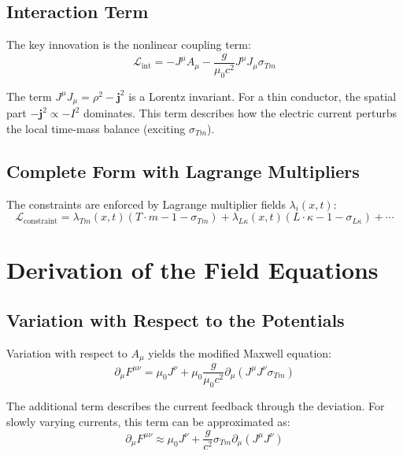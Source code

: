 	\subsection{Interaction Term}
	The key innovation is the nonlinear coupling term:
	\begin{equation}
		\mathcal{L}_{\text{int}} = -J^\mu A_\mu - \frac{g}{\mu_0 c^2} J^\mu J_\mu \sigma_{Tm} \label{eq:L_int}
	\end{equation}
	
	The term $J^\mu J_\mu = \rho^2 - \mathbf{j}^2$ is a Lorentz invariant. For a thin conductor, the spatial part $-\mathbf{j}^2 \propto -I^2$ dominates. This term describes how the electric current perturbs the local time-mass balance (exciting $\sigma_{Tm}$).
	
	\subsection{Complete Form with Lagrange Multipliers}
	The constraints are enforced by Lagrange multiplier fields $\lambda_i(x,t)$:
	\begin{equation}
		\mathcal{L}_{\text{constraint}} = \lambda_{Tm}(x,t) (T \cdot m - 1 - \sigma_{Tm}) + \lambda_{L\kappa}(x,t) (L \cdot \kappa - 1 - \sigma_{L\kappa}) + \cdots \label{eq:L_constraint}
	\end{equation}
	
	\section{Derivation of the Field Equations}
	\subsection{Variation with Respect to the Potentials}
	Variation with respect to $A_\mu$ yields the modified Maxwell equation:
	\begin{equation}
		\partial_\mu F^{\mu\nu} = \mu_0 J^\nu + \mu_0 \frac{g}{\mu_0 c^2} \partial_\mu (J^\mu J^\nu \sigma_{Tm}) \label{eq:maxwell_mod}
	\end{equation}
	
	The additional term describes the current feedback through the deviation. For slowly varying currents, this term can be approximated as:
	\begin{equation}
		\partial_\mu F^{\mu\nu} \approx \mu_0 J^\nu + \frac{g}{c^2} \sigma_{Tm} \partial_\mu (J^\mu J^\nu) \label{eq:maxwell_approx}
	\end{equation}
	
